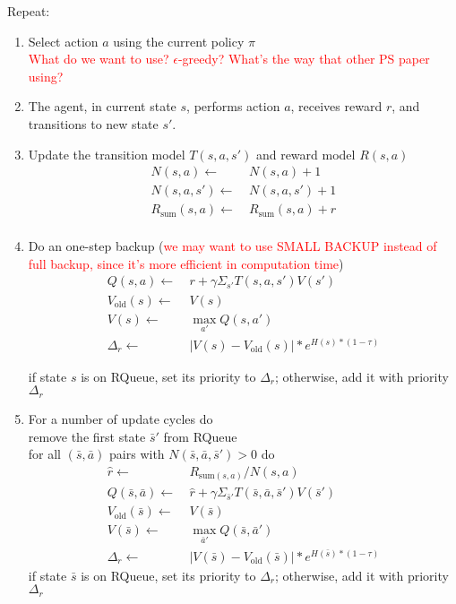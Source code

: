 \documentclass{article}
\begin{document}
Repeat:\\

\begin{enumerate}

\item Select action \(a\) using the current policy $\pi$\\
\textcolor{red}{What do we want to use? $\epsilon$-greedy? What's the way that other PS paper using?}

\item The agent, in current state \(s\), performs action \(a\), receives reward \(r\), and transitions to new state \(s'\).

\item Update the transition model \(T(s,a,s')\) and reward model \(R(s,a)\)
\[
\begin{split}
N(s,a) \leftarrow &\ N(s,a) + 1\\
N(s,a,s') \leftarrow &\ N(s,a,s') + 1\\
R_{\text{sum}}(s,a) \leftarrow &\ R_{\text{sum}}(s,a) + r\\
\end{split}
\]

\item Do an one-step backup (\textcolor{red}{we may want to use SMALL BACKUP instead of full backup, since it's more efficient in computation time})\\
\[
\begin{split}
Q(s,a) \leftarrow &\ r + \gamma \Sigma_{s'}T(s,a,s')V(s')\\
V_{\text{old}}(s) \leftarrow &\ V(s)\\
V(s) \leftarrow &\ \max_{a'}Q(s,a')\\
\Delta_r \leftarrow &\ |V(s)-V_{\text{old}}(s)| * e^{H(s)*(1-\tau)}
\end{split}
\]

if state $s$ is on RQueue, set its priority to $\Delta_r$; otherwise, add it with priority $\Delta_r$

\item For a number of update cycles do\\
remove the first state $\bar{s}'$ from RQueue\\
for all $(\bar{s},\bar{a})$ pairs with $N(\bar{s},\bar{a},\bar{s}')>0$ do
\[
\begin{split}
\hat{r} \leftarrow &\ R_{\text{sum}(s,a)}/N(s,a)\\
Q(\bar{s},\bar{a}) \leftarrow &\ \hat{r} +  \gamma \Sigma_{\bar{s}'}T(\bar{s},\bar{a},\bar{s}')V(\bar{s}')\\
V_{\text{old}}(\bar{s}) \leftarrow &\ V(\bar{s})\\
V(\bar{s}) \leftarrow &\ \max_{\bar{a}'}Q(\bar{s},\bar{a}')\\
\Delta_r \leftarrow &\ |V(\bar{s})-V_{\text{old}}(\bar{s})| * e^{H(\bar{s})*(1-\tau)}
\end{split}
\] 
if state $\bar{s}$ is on RQueue, set its priority to $\Delta_r$; otherwise, add it with priority $\Delta_r$


\end{enumerate}
\end{document}
